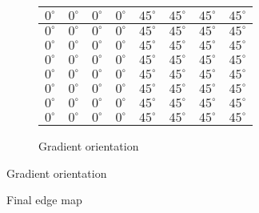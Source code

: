 \documentclass[a4paper]{article}
\begin{document}
\begin{figure}[!h]
\begin{subfigure}{\textwidth}
	\centering
\begin{tabular}{|c|c|c|c|c|c|c|c|}
\hline
$0^{\circ}$ & $0^{\circ}$ & $0^{\circ}$ & $0^{\circ}$ & $45^{\circ}$ & $45^{\circ}$ & $45^{\circ}$ & $45^{\circ}$\\ \hline
$0^{\circ}$ & $0^{\circ}$ & $0^{\circ}$ & $0^{\circ}$ & $45^{\circ}$ & $45^{\circ}$ & $45^{\circ}$ & $45^{\circ}$\\ \hline
$0^{\circ}$ & $0^{\circ}$ & $0^{\circ}$ & $0^{\circ}$ & $45^{\circ}$ & $45^{\circ}$ & $45^{\circ}$ & $45^{\circ}$\\ \hline
$0^{\circ}$ & $0^{\circ}$ & $0^{\circ}$ & $0^{\circ}$ & $45^{\circ}$ & $45^{\circ}$ & $45^{\circ}$ & $45^{\circ}$\\ \hline
$0^{\circ}$ & $0^{\circ}$ & $0^{\circ}$ & $0^{\circ}$ & $45^{\circ}$ & $45^{\circ}$ & $45^{\circ}$ & $45^{\circ}$\\ \hline
$0^{\circ}$ & $0^{\circ}$ & $0^{\circ}$ & $0^{\circ}$ & $45^{\circ}$ & $45^{\circ}$ & $45^{\circ}$ & $45^{\circ}$\\ \hline
$0^{\circ}$ & $0^{\circ}$ & $0^{\circ}$ & $0^{\circ}$ & $45^{\circ}$ & $45^{\circ}$ & $45^{\circ}$ & $45^{\circ}$\\ \hline
$0^{\circ}$ & $0^{\circ}$ & $0^{\circ}$ & $0^{\circ}$ & $45^{\circ}$ & $45^{\circ}$ & $45^{\circ}$ & $45^{\circ}$\\ \hline

\end{tabular}
	\caption{Gradient orientation}
\end{subfigure}

\end{figure}

\begin{figure}[!h]
	\centering
	\caption{Final edge map}
\end{figure}
\end{document}
